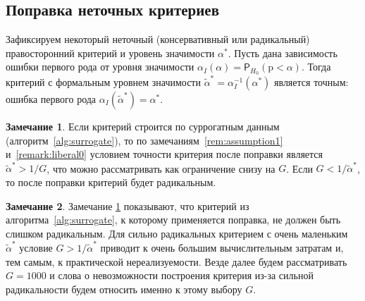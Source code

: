 \documentclass[specialist,
substylefile = spbu_report.rtx,
subf,href,colorlinks=true, 12pt]{disser}
\theoremstyle{definition}
\newtheorem{algorithm}{Алгоритм}
\newtheorem{remark}{Замечание}
\newtheorem{assumption}{Предположение}
\begin{document}
\subsection{Поправка неточных критериев}\label{sect:correction}
Зафиксируем некоторый неточный (консервативный или радикальный) правосторонний критерий и уровень значимости $\alpha^*$. Пусть дана зависимость ошибки первого рода от уровня значимости $\alpha_I(\alpha)=\mathsf P_{H_0}(\mathrm p < \alpha)$. 
Тогда критерий с формальным уровнем значимости $\widetilde\alpha^*=\alpha_I^{-1}(\alpha^*)$ является точным: ошибка первого рода $\alpha_I(\widetilde\alpha^*)=\alpha^*$.
\begin{remark}
\label{remark:liberal1}
	Если критерий строится по суррогатным данным (алгоритм~\ref{alg:surrogate}), то по замечаниям~\ref{rem:assumption1} и~\ref{remark:liberal0} условием точности критерия после поправки является $\widetilde\alpha^* > 1/G$, что можно рассматривать как ограничение снизу на $G$. Если $G < 1/\widetilde\alpha^*$, то после поправки критерий будет радикальным.
\end{remark}

\begin{remark}\label{remark:liberal}
Замечание \ref{remark:liberal1} показывают, что критерий из алгоритма~\ref{alg:surrogate}, к которому применяется поправка, не должен быть слишком радикальным. Для сильно радикальных критерием с очень маленьким $\widetilde\alpha^*$ условие $G > 1/\widetilde\alpha^*$ приводит к очень большим вычислительным затратам и, тем самым, к практической нереализуемости. Везде далее будем рассматривать $G=1000$ и слова о невозможности построения критерия из-за сильной радикальности будем относить именно к этому выбору $G$.
\end{remark}
\end{document}
